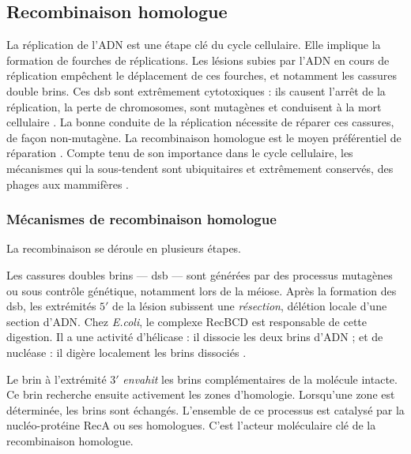 \documentclass[11pt, oneside]{scrartcl}
\begin{document}

\subsection{Recombinaison homologue}
\label{sec:orgheadline6}

La réplication de l'ADN est une étape clé du cycle cellulaire. Elle implique la
formation de fourches de réplications. Les lésions subies par l'ADN en cours de
réplication empêchent le déplacement de ces fourches, et notamment les cassures
double brins. Ces \ac{dsb} sont extrêmement cytotoxiques : ils causent l'arrêt
de la réplication, la perte de chromosomes, sont mutagènes et conduisent à la
mort cellulaire \cite{watson_molecular_2014}. La bonne conduite de la
réplication nécessite de réparer ces cassures, de façon non-mutagène. La
recombinaison homologue est le moyen préférentiel de réparation
\cite{lusetti_bacterial_2002}. Compte tenu de son importance dans le cycle
cellulaire, les mécanismes qui la sous-tendent sont ubiquitaires et extrêmement
conservés, des phages aux mammifères \cite{cromie_recombination_2001}.

\subsubsection{Mécanismes de recombinaison homologue}
\label{sec:orgheadline3}

La recombinaison se déroule en plusieurs étapes. 

Les cassures doubles brins --- \ac{dsb} --- sont générées par des processus
mutagènes ou sous contrôle génétique, notamment lors de la méiose. Après la
formation des \ac{dsb}, les extrémités \(5'\) de la lésion subissent une
\emph{résection}, délétion locale d'une section d'ADN. Chez \emph{E.coli}, le complexe
RecBCD est responsable de cette digestion. Il a une activité d'hélicase : il
dissocie les deux brins d'ADN ; et de nucléase : il digère localement les brins
dissociés \cite{dillingham_recbcd_2008}.

Le brin à l'extrémité \(3'\) \emph{envahit} les brins complémentaires de la molécule
intacte. Ce brin recherche ensuite activement les zones d'homologie. Lorsqu'une
zone est déterminée, les brins sont échangés. L'ensemble de ce processus est
catalysé par la nucléo-protéine RecA \cite{chen_mechanism_2008} ou ses
homologues. C'est l'acteur moléculaire clé de la recombinaison homologue.
\end{document}
